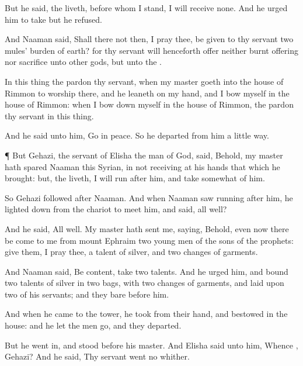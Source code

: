 {But he
said,
{} the
{}
liveth,
before whom I
stand, I will
receive none. And he
urged him to
take
{} but he
refused.

And
Naaman
said, Shall there not then, I pray thee, be
given to thy
servant
two
mules’
burden of
earth? for thy
servant will henceforth
offer neither burnt
offering nor
sacrifice unto
other
gods, but unto the
{}.

In this
thing the
{}
pardon thy
servant,
{} when my
master
goeth into the
house of
Rimmon to
worship there, and he
leaneth on my
hand, and I
bow myself in the
house of
Rimmon: when I bow
down myself in the
house of
Rimmon, the
{}
pardon thy
servant in this
thing.

And he
said unto him,
Go in
peace. So he
departed from him a
little
way.


\par }{\PP {}¶ But
Gehazi, the
servant of
Elisha the
man of
God,
said, Behold, my
master hath
spared
Naaman this
Syrian, in not
receiving at his
hands that which he
brought: but,
{} the
{}
liveth, I will
run
after him, and
take
somewhat of him.

So
Gehazi
followed
after
Naaman. And when
Naaman
saw
{}
running
after him, he lighted
down from the
chariot to
meet him, and
said,
{} all
well?

And he
said, All
{}
well. My
master hath
sent me,
saying, Behold, even now there be
come to me from
mount
Ephraim
two young
men of the
sons of the
prophets:
give them, I pray thee, a
talent of
silver, and
two
changes of
garments.

And
Naaman
said, Be
content,
take two
talents. And he
urged him, and
bound
two
talents of
silver in
two
bags, with
two
changes of
garments, and
laid
{} upon
two of his
servants; and they
bare
{}
before him.

And when he
came to the
tower, he
took
{} from their
hand, and
bestowed
{} in the
house: and he let the
men
go, and they
departed.

But he went
in, and
stood before his
master. And
Elisha
said unto him,
Whence
{},
Gehazi? And he
said, Thy
servant
went no
whither.

}
